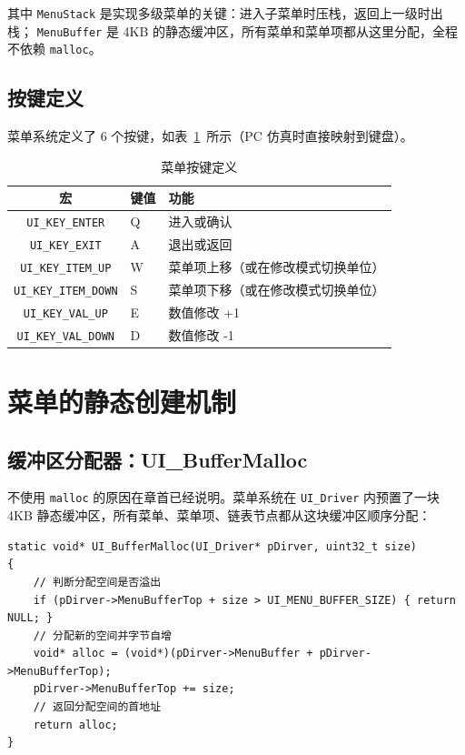 其中 \texttt{MenuStack} 是实现多级菜单的关键：进入子菜单时压栈，返回上一级时出栈； \texttt{MenuBuffer} 是 4KB 的静态缓冲区，所有菜单和菜单项都从这里分配，全程不依赖 \texttt{malloc}。

\subsection{按键定义}

菜单系统定义了 6 个按键，如表~\ref{tab:menu-key}~所示（PC 仿真时直接映射到键盘）。

\begin{table}[htbp]
\centering \caption{菜单按键定义} \label{tab:menu-key}
    \begin{tabular}{cll}
        \toprule
        宏 & 键值 & 功能 \\
        \midrule
        \texttt{UI\_KEY\_ENTER}    & Q & 进入或确认 \\
        \texttt{UI\_KEY\_EXIT}     & A & 退出或返回 \\
        \texttt{UI\_KEY\_ITEM\_UP} & W & 菜单项上移（或在修改模式切换单位） \\
        \texttt{UI\_KEY\_ITEM\_DOWN}& S & 菜单项下移（或在修改模式切换单位） \\
        \texttt{UI\_KEY\_VAL\_UP}   & E & 数值修改 +1 \\
        \texttt{UI\_KEY\_VAL\_DOWN} & D & 数值修改 -1 \\
        \bottomrule
    \end{tabular}
\end{table}

\section{菜单的静态创建机制}

\subsection{缓冲区分配器：UI\_BufferMalloc}

不使用 \texttt{malloc} 的原因在章首已经说明。菜单系统在 \texttt{UI\_Driver} 内预置了一块 4KB 静态缓冲区，所有菜单、菜单项、链表节点都从这块缓冲区顺序分配：

\begin{lstlisting}[style=c]
static void* UI_BufferMalloc(UI_Driver* pDirver, uint32_t size)
{
    // 判断分配空间是否溢出
    if (pDirver->MenuBufferTop + size > UI_MENU_BUFFER_SIZE) { return NULL; }
    // 分配新的空间并字节自增
    void* alloc = (void*)(pDirver->MenuBuffer + pDirver->MenuBufferTop);
    pDirver->MenuBufferTop += size;
    // 返回分配空间的首地址
    return alloc;
}
\end{lstlisting}

